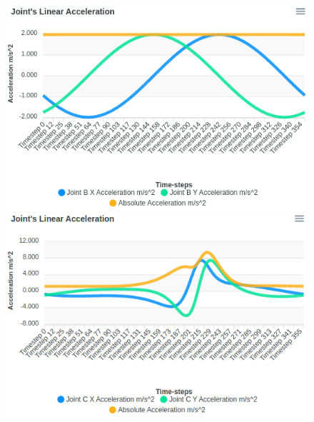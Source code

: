 \documentclass[12pt]{article}
\begin{document}
\begin{figure}[ht]
  \includegraphics[scale=0.45]{../pmks-plots/linJointAcc/linJointAccB.png}%
  \includegraphics[scale=0.45]{../pmks-plots/linJointAcc/linJointAccC.png}


\end{figure}
\end{document}
